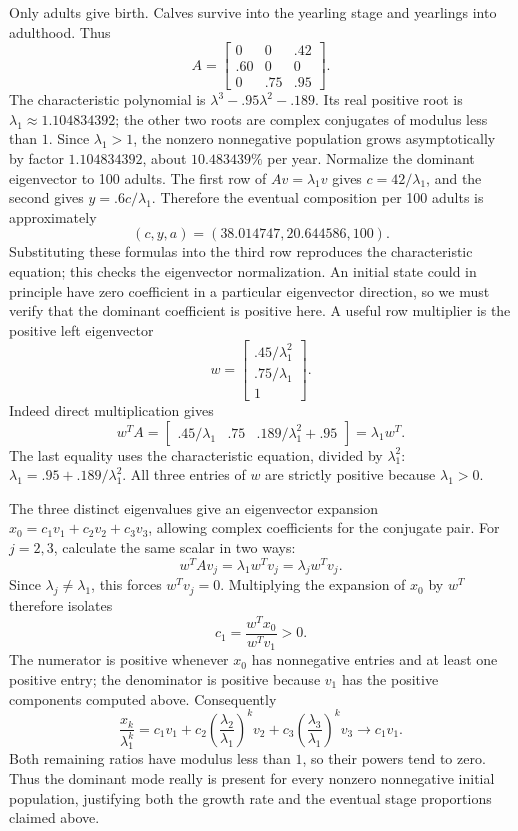 Only adults give birth. Calves survive into the yearling stage and
yearlings into adulthood. Thus
\[A=\begin{bmatrix}0&0&.42\\.60&0&0\\0&.75&.95\end{bmatrix}.\]
The characteristic polynomial is
$\lambda^3-.95\lambda^2-.189$. Its real positive root is
$\lambda_1\approx1.104834392$; the other two roots are complex
conjugates of modulus less than $1$. Since $\lambda_1>1$, the
nonzero nonnegative population grows asymptotically by factor
$1.104834392$, about $10.483439\%$ per year.
Normalize the dominant eigenvector to 100 adults. The first row of
$Av=\lambda_1v$ gives $c=42/\lambda_1$, and the second gives
$y=.6c/\lambda_1$. Therefore the eventual composition per 100
adults is approximately
\[(c,y,a)=(38.014747,20.644586,100).\]
Substituting these formulas into the third row reproduces the
characteristic equation; this checks the eigenvector normalization.
An initial state could in principle have zero coefficient in a particular
eigenvector direction, so we must verify that the dominant coefficient
is positive here. A useful row multiplier is the positive left eigenvector
\[
w=\begin{bmatrix}.45/\lambda_1^2\\.75/\lambda_1\\1\end{bmatrix}.
\]
Indeed direct multiplication gives
\[
w^TA=\begin{bmatrix}.45/\lambda_1&.75&.189/\lambda_1^2+.95\end{bmatrix}
=\lambda_1w^T.
\]
The last equality uses the characteristic equation, divided by
$\lambda_1^2$: $\lambda_1=.95+.189/\lambda_1^2$.
All three entries of $w$ are strictly positive because $\lambda_1>0$.

The three distinct eigenvalues give an eigenvector expansion
$x_0=c_1v_1+c_2v_2+c_3v_3$, allowing complex coefficients for the
conjugate pair. For $j=2,3$, calculate the same scalar in two ways:
\[
w^TAv_j=\lambda_1w^Tv_j=\lambda_jw^Tv_j.
\]
Since $\lambda_j\ne\lambda_1$, this forces $w^Tv_j=0$.
Multiplying the expansion of $x_0$ by $w^T$ therefore isolates
\[
c_1=\frac{w^Tx_0}{w^Tv_1}>0.
\]
The numerator is positive whenever $x_0$ has nonnegative entries and at
least one positive entry; the denominator is positive because $v_1$
has the positive components computed above. Consequently
\[
\frac{x_k}{\lambda_1^k}
=c_1v_1+c_2\left(\frac{\lambda_2}{\lambda_1}\right)^kv_2
       +c_3\left(\frac{\lambda_3}{\lambda_1}\right)^kv_3
\longrightarrow c_1v_1.
\]
Both remaining ratios have modulus less than $1$, so their powers tend
to zero. Thus the dominant mode really is present for every nonzero
nonnegative initial population, justifying both the growth rate and the
eventual stage proportions claimed above.
